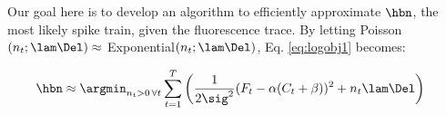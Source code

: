 
Our goal here is to develop an algorithm to efficiently approximate $\hbn$, the most likely spike train, given the fluorescence trace.  %
%
% 
By letting Poisson$(n_t; \lam\Del) \approx$ Exponential$(n_t; \lam\Del)$, Eq. \eqref{eq:logobj1} becomes:

\begin{align} \label{eq:obj2}
\hbn &\approx \argmin_{n_t>0 \, \forall t}  \sum_{t=1}^T \bigg( \frac{1}{2 \sig^2}(F_t - \alpha(C_t + \beta))^2  + n_t \lam \Del \bigg) %
\end{align}

